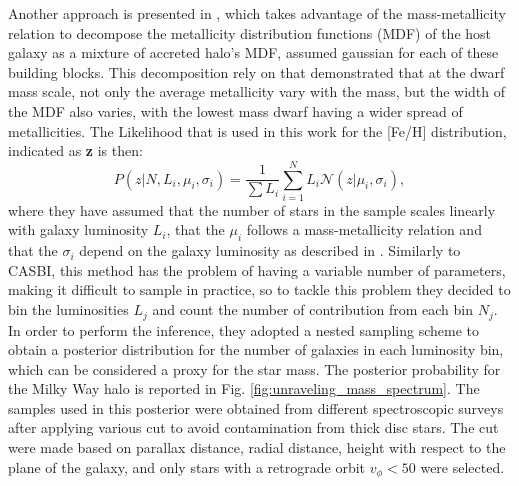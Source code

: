 Another approach is presented in \cite{deasonUnravellingMassSpectrum2023}, which takes advantage of the mass-metallicity relation to decompose the metallicity distribution functions (MDF) of the host galaxy as a mixture of accreted halo's MDF, assumed gaussian for each of these building blocks. This decomposition rely on \cite{kirbyMULTIELEMENTABUNDANCEMEASUREMENTS2011} that demonstrated that at the dwarf mass scale, not only the average metallicity vary with the mass, but the width of the MDF also varies, with the lowest mass dwarf having a wider spread of metallicities. The Likelihood that is used in this work for the [Fe/H] distribution, indicated as \textbf{z} is then:
\begin{equation}
    P(z|N, {L_i}, {\mu_i}, {\sigma_i}) = \frac{1}{\sum{L_i}} \sum_{i=1}^N L_i \mathcal{N}(z|\mu_i, \sigma_i),
\end{equation}
where they have assumed that the number of stars in the sample scales linearly with galaxy luminosity $L_i$, that the $\mu_i$ follows a mass-metallicity relation and that the $\sigma_i$ depend on the galaxy luminosity as described in \cite{kirbyMULTIELEMENTABUNDANCEMEASUREMENTS2011}. 
Similarly to CASBI, this method has the problem of having a variable number of parameters, making it difficult to sample in practice, so to tackle this problem they decided to bin the luminosities $L_j$ and count the number of contribution from each bin $N_j$. In order to perform the inference, they adopted a nested sampling scheme to obtain a posterior distribution for the number of galaxies in each luminosity bin, which can be considered a proxy for the star mass. The posterior probability for the Milky Way halo is reported in Fig. \ref{fig:unraveling_mass_spectrum}. The samples used in this posterior were obtained from different spectroscopic surveys after applying various cut to avoid contamination from thick disc stars. The cut were made based on  parallax distance, radial distance, height with respect to the plane of the galaxy, and only stars with a retrograde orbit $v_\phi < 50$ were selected.

